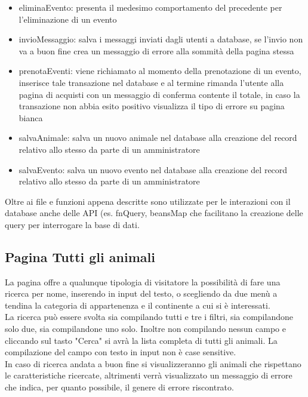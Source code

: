 \begin{itemize}
            \item eliminaEvento: presenta il medesimo comportamento del precedente per l'eliminazione di un evento
            \item invioMessaggio: salva i messaggi inviati dagli utenti a database, se l'invio non va a buon fine crea un messaggio di errore alla sommità della pagina stessa
            \item prenotaEventi: viene richiamato al momento della prenotazione di un evento, inserisce tale transazione nel database e al termine rimanda l'utente alla pagina di acquisti con un messaggio di conferma contente il totale, in caso la transazione non abbia esito positivo visualizza il tipo di errore su pagina bianca
            \item salvaAnimale: salva un nuovo animale nel database alla creazione del record relativo allo stesso da parte di un amministratore
            \item salvaEvento: salva un nuovo evento nel database alla creazione del record relativo allo stesso da parte di un amministratore
        \end{itemize}
    Oltre ai file e funzioni appena descritte sono utilizzate per le interazioni con il database anche delle API (es. fnQuery, beansMap che facilitano la creazione delle query per interrogare la base di dati.
    \subsection{Pagina Tutti gli animali}
        La pagina offre a qualunque tipologia di visitatore la possibilità di fare una ricerca per nome, inserendo in input del testo, o scegliendo da due menù a tendina la categoria di appartenenza e il continente a cui si è interessati.\\
        La ricerca può essere svolta sia compilando tutti e tre i filtri, sia compilandone solo due, sia compilandone uno solo. Inoltre non compilando nessun campo e cliccando sul tasto "Cerca" si avrà la lista completa di tutti gli animali. La compilazione del campo con testo in input non è case sensitive.\\
        In caso di ricerca andata a buon fine si visualizzeranno gli animali che rispettano le caratteristiche ricercate, altrimenti verrà visualizzato un messaggio di errore che indica, per quanto possibile, il genere di errore riscontrato.
\pagebreak
